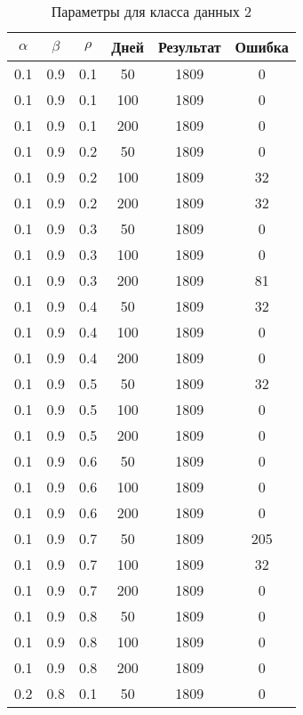 \begin{center}
\captionsetup{justification=raggedright,singlelinecheck=off}
\begin{longtable}[c]{|c|c|c|c|c|c|}
\caption{Параметры для класса данных 2\label{tbl:table_kd2}}
		\\ \hline
		$\alpha$ & $\beta$ & $\rho$ & Дней & Результат & Ошибка 
		\\ \hline
		0.1 &  0.9 &  0.1 &   50 &  1809 &     0 \\
		0.1 &  0.9 &  0.1 &  100 &  1809 &     0 \\
		0.1 &  0.9 &  0.1 &  200 &  1809 &     0 \\
	   \hline
		0.1 &  0.9 &  0.2 &   50 &  1809 &     0 \\
		0.1 &  0.9 &  0.2 &  100 &  1809 &    32 \\
		0.1 &  0.9 &  0.2 &  200 &  1809 &    32 \\
	   \hline
		0.1 &  0.9 &  0.3 &   50 &  1809 &     0 \\
		0.1 &  0.9 &  0.3 &  100 &  1809 &     0 \\
		0.1 &  0.9 &  0.3 &  200 &  1809 &    81 \\
	   \hline
		0.1 &  0.9 &  0.4 &   50 &  1809 &    32 \\
		0.1 &  0.9 &  0.4 &  100 &  1809 &     0 \\
		0.1 &  0.9 &  0.4 &  200 &  1809 &     0 \\
	   \hline
		0.1 &  0.9 &  0.5 &   50 &  1809 &    32 \\
		0.1 &  0.9 &  0.5 &  100 &  1809 &     0 \\
		0.1 &  0.9 &  0.5 &  200 &  1809 &     0 \\
	   \hline
		0.1 &  0.9 &  0.6 &   50 &  1809 &     0 \\
		0.1 &  0.9 &  0.6 &  100 &  1809 &     0 \\
		0.1 &  0.9 &  0.6 &  200 &  1809 &     0 \\
	   \hline
		0.1 &  0.9 &  0.7 &   50 &  1809 &   205 \\
		0.1 &  0.9 &  0.7 &  100 &  1809 &    32 \\
		0.1 &  0.9 &  0.7 &  200 &  1809 &     0 \\
	   \hline
		0.1 &  0.9 &  0.8 &   50 &  1809 &     0 \\
		0.1 &  0.9 &  0.8 &  100 &  1809 &     0 \\
		0.1 &  0.9 &  0.8 &  200 &  1809 &     0 \\
	   \hline
		0.2 &  0.8 &  0.1 &   50 &  1809 &     0 \\

\end{longtable}
\end{center}
